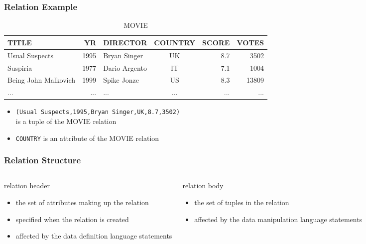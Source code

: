 \documentclass[dvipsnames]{beamer}
\theoremstyle{plain}
\begin{document}
\begin{frame}
  \frametitle{Relation Example}

  \begin{example}
    \begin{tiny}
    \begin{table}
      \caption{MOVIE}
      \begin{tabular}{|l|r|l|c|r|r|}\hline
TITLE                &   YR & DIRECTOR      & COUNTRY & SCORE & VOTES\\\hline\hline
Usual Suspects       & 1995 & Bryan Singer  & UK      &   8.7 &  3502\\\hline
Suspiria             & 1977 & Dario Argento & IT      &   7.1 &  1004\\\hline
Being John Malkovich & 1999 & Spike Jonze   & US      &   8.3 & 13809\\\hline
...                  &  ... & ...           & ...     &   ... &   ...\\\hline
      \end{tabular}
    \end{table}
    \end{tiny}

    \pause
    \begin{itemize}
      \item \texttt{(Usual Suspects,1995,Bryan Singer,UK,8.7,3502)}\\
        is a tuple of the MOVIE relation
      \item \texttt{COUNTRY} is an attribute of the MOVIE relation
    \end{itemize}
  \end{example}
\end{frame}

\begin{frame}
  \frametitle{Relation Structure}

  \begin{columns}[t]
    \begin{block}{relation header}
      \begin{itemize}
        \item the set of attributes making up the relation
        \item specified when the relation is created
        \item affected by the data definition language statements
      \end{itemize}
    \end{block}

    \pause
    \begin{block}{relation body}
      \begin{itemize}
        \item the set of tuples in the relation
        \item affected by the data manipulation language statements
      \end{itemize}
    \end{block}
  \end{columns}
\end{frame}
\end{document}
